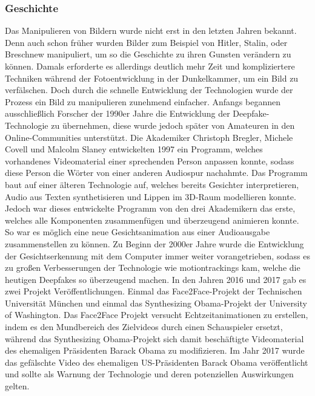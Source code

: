 \subsubsection*{Geschichte}
Das Manipulieren von Bildern wurde nicht erst in den letzten Jahren bekannt. Denn auch schon früher wurden Bilder zum Beispiel von Hitler, Stalin, oder Breschnew manipuliert, um so die Geschichte zu ihren Gunsten verändern zu können.
Damals erforderte es allerdings deutlich mehr Zeit und kompliziertere Techniken während der Fotoentwicklung in der Dunkelkammer, um ein Bild zu verfälschen. Doch durch die schnelle Entwicklung der Technologien wurde der Prozess ein Bild zu manipulieren zunehmend einfacher.
Anfangs begannen ausschließlich Forscher der 1990er Jahre die Entwicklung der Deepfake-Technologie zu übernehmen, diese wurde jedoch später von Amateuren in den Online-Communities unterstützt.
Die Akademiker Christoph Bregler, Michele Covell und Malcolm Slaney entwickelten 1997 ein Programm, welches vorhandenes Videomaterial einer sprechenden Person anpassen konnte, sodass diese Person die Wörter von einer anderen Audiospur nachahmte.
Das Programm baut auf einer älteren Technologie auf, welches bereits Gesichter interpretieren, Audio aus Texten synthetisieren und Lippen im 3D-Raum modellieren konnte.
Jedoch war dieses entwickelte Programm von den drei Akademikern das erste, welches alle Komponenten zusammenfügen und überzeugend animieren konnte. So war es möglich eine neue Gesichtsanimation aus einer Audioausgabe zusammenstellen zu können.\newline
Zu Beginn der 2000er Jahre wurde die Entwicklung der Gesichtserkennung mit dem Computer immer weiter vorangetrieben,
sodass es zu großen Verbesserungen der Technologie wie \glspl{motiontracking} kam, welche die heutigen Deepfakes so
überzeugend machen.\newline
In den Jahren 2016 und 2017 gab es zwei Projekt Veröffentlichungen. Einmal das Face2Face-Projekt der Technischen Universität München und einmal das Synthesizing Obama-Projekt der University of Washington. \newline
Das Face2Face Projekt versucht Echtzeitanimationen zu erstellen, indem es den Mundbereich des Zielvideos durch einen Schauspieler ersetzt, während das Synthesizing Obama-Projekt sich damit beschäftigte Videomaterial des ehemaligen Präsidenten Barack Obama zu modifizieren.\cite{ResearchGate}\newline
Im Jahr 2017 wurde das gefälschte Video des ehemaligen US-Präsidenten Barack Obama veröffentlicht und sollte als Warnung der Technologie und deren potenziellen Auswirkungen gelten.
